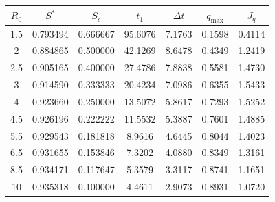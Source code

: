 \begin{tabular}{ccccccc}
\toprule
$R_0$ & $S^*$ & $S_c$ & $t_1$ & $\Delta t$ & $q_{\max}$ & $J_q$ \\
\midrule
1.5 & 0.793494 & 0.666667 & 95.6076 & 7.1763 & 0.1598 & 0.4114 \\
2 & 0.884865 & 0.500000 & 42.1269 & 8.6478 & 0.4349 & 1.2419 \\
2.5 & 0.905165 & 0.400000 & 27.4786 & 7.8838 & 0.5581 & 1.4730 \\
3 & 0.914590 & 0.333333 & 20.4234 & 7.0986 & 0.6355 & 1.5433 \\
4 & 0.923660 & 0.250000 & 13.5072 & 5.8617 & 0.7293 & 1.5252 \\
4.5 & 0.926196 & 0.222222 & 11.5532 & 5.3887 & 0.7601 & 1.4885 \\
5.5 & 0.929543 & 0.181818 & 8.9616 & 4.6445 & 0.8044 & 1.4023 \\
6.5 & 0.931655 & 0.153846 & 7.3202 & 4.0880 & 0.8349 & 1.3161 \\
8.5 & 0.934171 & 0.117647 & 5.3579 & 3.3117 & 0.8741 & 1.1651 \\
10 & 0.935318 & 0.100000 & 4.4611 & 2.9073 & 0.8931 & 1.0720 \\
\bottomrule
\end{tabular}
